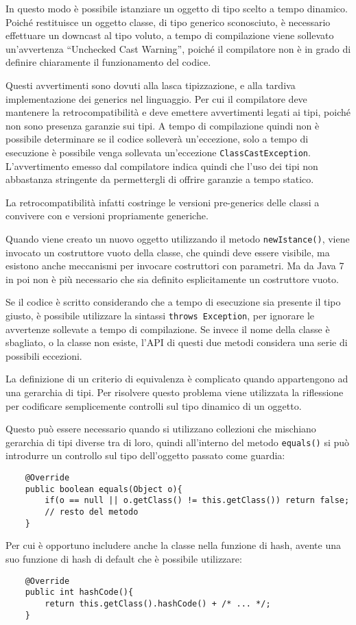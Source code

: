 \documentclass{article}
\numberwithin{equation}{subsection}
\begin{document}
In questo modo è possibile istanziare un oggetto di tipo scelto a tempo dinamico. Poiché restituisce un oggetto classe, di tipo generico sconosciuto, è 
necessario effettuare un downcast al tipo voluto, a tempo di compilazione viene sollevato un'avvertenza ``Unchecked Cast Warning'', poiché il 
compilatore non è in grado di definire chiaramente il funzionamento del codice. 

Questi avvertimenti sono dovuti alla lasca tipizzazione, e alla tardiva implementazione dei generics nel linguaggio. Per cui il compilatore deve mantenere 
la retrocompatibilità e deve emettere avvertimenti legati ai tipi, poiché non sono presenza garanzie sui tipi. A tempo di compilazione quindi non è 
possibile determinare se il codice solleverà un'eccezione, solo a tempo di esecuzione è possibile venga sollevata un'eccezione \verb|ClassCastException|. 
L'avvertimento emesso dal compilatore indica quindi che l'uso dei tipi non abbastanza stringente da permettergli di offrire garanzie a tempo statico. 

La retrocompatibilità infatti costringe le versioni pre-generics delle classi a convivere con e versioni propriamente generiche. 


Quando viene creato un nuovo oggetto utilizzando il metodo \verb|newIstance()|, viene invocato un costruttore vuoto della classe, che quindi deve 
essere visibile, ma esistono anche meccanismi per invocare costruttori con parametri. Ma da Java 7 in poi non è più necessario che sia definito 
esplicitamente un costruttore vuoto. 

Se il codice è scritto considerando che a tempo di esecuzione sia presente il tipo giusto, è possibile utilizzare la sintassi \verb|throws Exception|, per ignorare 
le avvertenze sollevate a tempo di compilazione. 
Se invece il nome della classe è sbagliato, o la classe non esiste, l'API di questi due metodi considera una serie di possibili eccezioni. 



La definizione di un criterio di equivalenza è complicato quando appartengono ad una gerarchia di tipi. Per risolvere questo problema viene utilizzata la riflessione 
per codificare semplicemente controlli sul tipo dinamico di un oggetto. 

Questo può essere necessario quando si utilizzano collezioni che mischiano gerarchia di tipi diverse tra di loro, quindi all'interno del metodo \verb|equals()| 
si può introdurre un controllo sul tipo dell'oggetto passato come guardia:
\begin{verbatim}
    @Override
    public boolean equals(Object o){
        if(o == null || o.getClass() != this.getClass()) return false;
        // resto del metodo 
    }
\end{verbatim}
Per cui è opportuno includere anche la classe nella funzione di hash, avente una suo funzione di hash di default che è possibile utilizzare:
\begin{verbatim}
    @Override
    public int hashCode(){
        return this.getClass().hashCode() + /* ... */;
    }
\end{verbatim}
\end{document}
